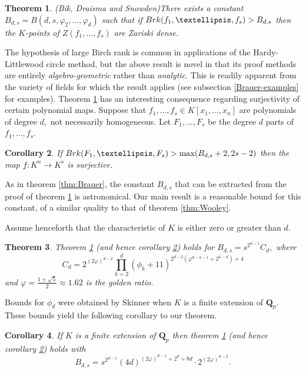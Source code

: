 \documentclass[10pt,a4paper]{amsart}
\let\ul\underline
\newtheorem{theorem}{Theorem}[section]
\newtheorem{corollary}[theorem]{Corollary}
\theoremstyle{definition}
\newcommand{\Q}{\mathbf{Q}}
\newcommand{\brk}{\textnormal{Brk}}
\begin{document}
\begin{theorem}(Bik, Draisma and Snowden)\label{thm:BDS}
     There exists a constant $B_{d,s} = B(d,s,\varphi_2,\ldots,\varphi_d)$ such that if $\brk(f_1,\ldots,f_s) > B_{d,s}$ then the $K$-points of $Z(f_1,\ldots,f_s)$ are Zariski dense.
\end{theorem}

The hypothesis of large Birch rank is common in applications of the Hardy-Littlewood circle method, but the above result is novel in that its proof methods are entirely \emph{algebro-geometric} rather than \emph{analytic}. This is readily apparent from the variety of fields for which the result applies (see subsection \ref{Brauer-examples} for examples). Theorem \ref{thm:BDS} has an interesting consequence regarding surjectivity of certain polynomial maps. Suppose that $f_1,\ldots,f_s\in K[x_1,\ldots,x_n]$ are polynomials of degree $d,$ not necessarily homogeneous. Let $F_1,\ldots,F_s$ be the degree $d$ parts of $f_1,\ldots,f_s.$

\begin{corollary}\label{cor:surj}
    If $\brk(F_1,\ldots,F_s) > \max(B_{d,s}+2, 2s-2)$ then the map $\ul{f}:K^n\to K^s$ is surjective. 
\end{corollary}

As in theorem \ref{thm:Brauer}, the constant $B_{d,s}$ that can be extracted from the proof of theorem \ref{thm:BDS} is astronomical.  Our main result is a reasonable bound for this constant, of a similar quality to that of theorem \ref{thm:Wooley}.  

Assume henceforth that the characteristic of $K$ is either zero or greater than $d.$

\begin{theorem}\label{thm:main}
Theorem \ref{thm:BDS} (and hence corollary \ref{cor:surj}) holds for $B_{d,s} = s^{2^{d-1}}C_d,$ where
\[
C_d = 2^{(2\varphi)^{d-2}} \prod_{k=2}^d (\phi_k+11)^{2^{d-2}(\varphi^{d-k-1}+2^{k-d})+4}
\]
and $\varphi = \frac{1+\sqrt{5}}{2}\approx 1.62$ is the golden ratio.    
\end{theorem}

Bounds for $\phi_d$ were obtained by Skinner \cite{Skinner-phi} when $K$ is a finite extension of $\Q_p.$ These bounds yield the following corollary to our theorem. 

\begin{corollary}\label{cor:p-adic} 
If $K$ is a finite extension of $\Q_p$ then theorem \ref{thm:BDS} (and hence corollary \ref{cor:surj}) holds with
\[
B_{d,s} = s^{2^{d-1}} (4d)^{(2\varphi)^{d-1}+2^d+8d}  \cdot 2^{(2\varphi)^{d-2}}. 
\]
\end{corollary}
\end{document}

